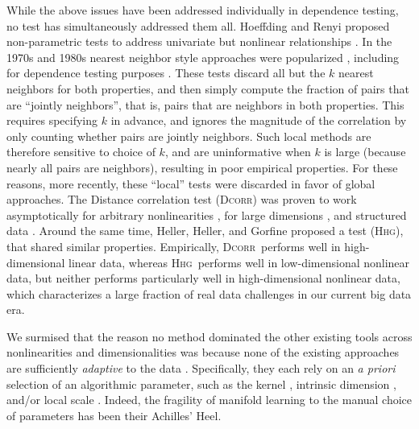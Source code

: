\documentclass[11pt]{article}
\providecommand{\sct}[1]{{\normalfont\textsc{#1}}}
\newcommand{\Hhg}{\sct{Hhg}}
\newcommand{\Dcorr}{\sct{Dcorr}}
\begin{document}
While the above issues have been addressed individually in dependence testing, no test has simultaneously addressed them all.    Hoeffding and Renyi proposed non-parametric tests to address univariate but nonlinear relationships \cite{Hoeffding1948,Renyi1959}.  In the 1970s and 1980s nearest neighbor style approaches were popularized \cite{Stone1977}, including for dependence testing purposes \cite{Friedman1983,Schilling1986}.  These tests discard all but the $k$ nearest neighbors for both properties, and then simply compute the fraction of pairs that are ``jointly neighbors'', that is, pairs that are neighbors in both properties. This requires specifying $k$ in advance, and ignores the magnitude of the correlation by only counting whether pairs are jointly neighbors.  Such local methods are therefore sensitive to choice of $k$, and are uninformative  when $k$ is large (because nearly all pairs are neighbors), resulting in poor empirical properties.
For these reasons, more recently, these ``local'' tests were discarded in favor of global approaches.  The Distance correlation test (\Dcorr) was proven to work asymptotically for arbitrary nonlinearities \cite{SzekelyRizzo2009}, for large dimensions \cite{SzekelyRizzo2013a}, and structured data \cite{Lyons2013}.
Around the same time, Heller, Heller, and Gorfine proposed a test (\Hhg), that shared similar properties.  Empirically, \Dcorr~performs well in high-dimensional linear data, whereas \Hhg~performs well in low-dimensional nonlinear data,
but neither performs particularly well in high-dimensional nonlinear data, which characterizes a large fraction of real data challenges in our current big data era.

We surmised that the reason no method dominated the other existing tools across nonlinearities and dimensionalities was because none of the existing approaches are sufficiently \emph{adaptive} to the data \cite{zhang2012adaptive}.  Specifically, they each rely on an \emph{a priori} selection of an algorithmic parameter, such as the kernel  \cite{scholkopf2002learning}, intrinsic dimension \cite{RoweisSaul2003}, and/or local scale \cite{Friedman1983,Schilling1986,Allard2012}. Indeed, the fragility of manifold learning to the manual choice of parameters has been their Achilles' Heel.
\end{document}
